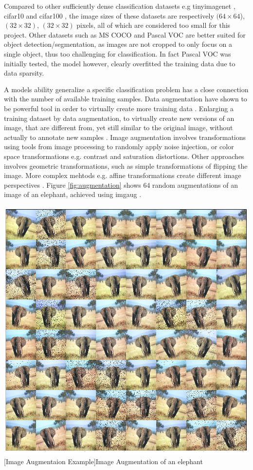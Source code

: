 \begin{enumdescript}
\begin{enumdescript}
		Compared to other sufficiently dense classification datasets e.g \gls{tinyimagenet} \cite{li_cs231n:_2018}, \gls{cifar10} and \gls{cifar100} \cite{krizhevsky_cifar-10_nodate}, the image sizes of these datasets are respectively $(64\times 64$), $(32\times 32)$, $(32\times 32)$ pixels, all of which are considered too small for this project. Other datasets such as MS COCO and Pascal VOC are better suited for object detection/segmentation, as images are not cropped to only focus on a single object, thus too challenging for classification. In fact Pascal VOC was initially tested, the model however, clearly overfitted the training data due to data sparsity. 
		
		\item[Image Augmentation] A models ability generalize a specific classification problem has a close connection with the number of available training samples. Data augmentation have shown to be powerful tool in order to virtually create more training data \cite{perez_effectiveness_2017}. Enlarging a training dataset by data augmentation, to virtually create new versions of an image, that are different from, yet still similar to the original image, without actually to annotate new samples \cite{goodfellow_deep_2016}. 
		Image augmentation involves transformations using tools from image processing to randomly apply noise injection, or color space transformations e.g. contrast and saturation distortions. Other approaches involves geometric transformations, such as simple transformations of flipping the image. More complex mehtods e.g. affine transformations create different image perspectives \cite{shorten_survey_2019}. Figure \ref{fig:augmentation} shows 64 random augmentations of an image of an elephant, achieved using \gls{imgaug} \cite{jung_imgaug:_nodate}.  
		
		\begin{minipage}[t]{\linewidth}
			\centering
			\includegraphics[width=.7\linewidth]{figures/augmentation/augmentation_high_resolution.png}
			[Image Augmentaion Example]{Image Augmentation of an elephant}
			\label{fig:augmentation}
		\end{minipage}
		

\end{enumdescript}
\end{enumdescript}
